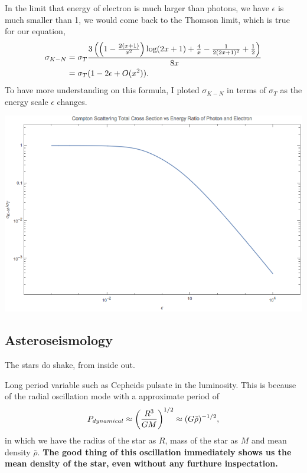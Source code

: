 \documentclass[letterpaper,10pt,english]{sphinxmanual}
\begin{document}
In the limit that energy of electron is much larger than photons, we have \(\epsilon\) is much smaller than 1, we would come back to the Thomson limit, which is true for our equation,
\begin{gather}
\begin{split}\sigma_{K-N} &= \sigma_T \frac{3 \left(\left(1-\frac{2 (x+1)}{x^2}\right) \log (2 x+1)+\frac{4}{x}-\frac{1}{2 (2 x+1)^2}+\frac{1}{2}\right)}{8 x} \\
& = \sigma_T (1 - 2\epsilon + O(x^2)).\end{split}\notag
\end{gather}
To have more understanding on this formula, I ploted \(\sigma_{K-N}\) in terms of \(\sigma_T\) as the energy scale \(\epsilon\) changes.

{\hfill\includegraphics{comptonScattering.png}\hfill}


\subsection{Asteroseismology}
\label{astrophysics:asteroseismology}
The stars do shake, from inside out.

Long period variable such as Cepheids pulsate in the luminosity. This is because of the radial oscillation mode with a approximate period of
\begin{gather}
\begin{split}P_{dynamical} \approx \left( \frac{R^3}{GM} \right)^{1/2} \approx (G\bar \rho)^{-1/2},\end{split}\notag
\end{gather}
in which we have the radius of the star as \(R\), mass of the star as \(M\) and mean density \(\bar \rho\). \textbf{The good thing of this oscillation immediately shows us the mean density of the star, even without any furthure inspectation.}
\end{document}
